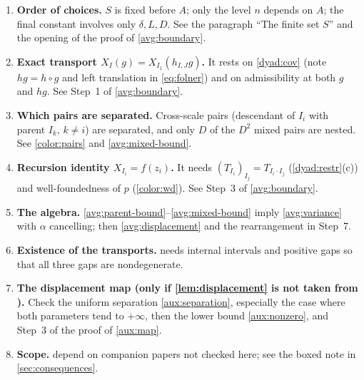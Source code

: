 \documentclass[11pt]{article}
\theoremstyle{definition}
\numberwithin{equation}{section}
\begin{document}
\begin{enumerate}
\item \textbf{Order of choices.} \(S\) is fixed before \(A\); only the
level \(n\) depends on \(A\); the final constant involves only
\(\delta,L,D\). See the paragraph ``The finite set \(S\)'' and the opening
of the proof of \cref{avg:boundary}.
\item \textbf{Exact transport \(X_I(g)=X_{I_1}(h_{I,J}g)\).} It rests on
\cref{dyad:cov} (note \(hg=h\circ g\) and left translation in
\eqref{eq:folner}) and on admissibility at both \(g\) and \(hg\). See
Step~1 of \cref{avg:boundary}.
\item \textbf{Which pairs are separated.} Cross-scale pairs (descendant of
\(I_i\) with parent \(I_k\), \(k\ne i\)) are separated, and only \(D\) of
the \(D^2\) mixed pairs are nested. See \cref{color:pairs} and
\eqref{avg:mixed-bound}.
\item \textbf{Recursion identity \(X_{I_i}=f(z_i)\).} It needs
\((T_{I_i})_{I_j}=T_{I_i\cdot I_j}\) (\cref{dyad:restr}(c)) and
well-foundedness of \(p\) (\cref{color:wd}). See Step~3 of
\cref{avg:boundary}.
\item \textbf{The algebra.} \eqref{avg:parent-bound}--\eqref{avg:mixed-bound}
imply \eqref{avg:variance} with \(\alpha\) cancelling; then
\eqref{avg:displacement} and the rearrangement in Step~7.
\item \textbf{Existence of the transports.}  needs
internal intervals and positive gaps so that all three gaps are
nondegenerate.
\item \textbf{The displacement map (only if \cref{lem:displacement} is not
taken from \cite{BenyaminiSternfeld1983}).} Check the uniform separation
\eqref{aux:separation}, especially the case where both parameters tend to
\(+\infty\), then the lower bound \eqref{aux:nonzero}, and Step~3 of the
proof of \cref{aux:map}.
\item \textbf{Scope.}  depend on
companion papers not checked here; see the boxed note in
\cref{sec:consequences}.
\end{enumerate}



\end{document}
